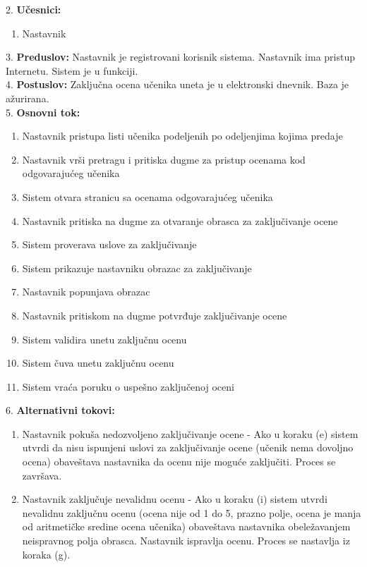 \documentclass{article}
\begin{document}
2. \textbf{Učesnici:}
\begin{enumerate} [label=(\alph*)]
\item Nastavnik
\end{enumerate} 

3. \textbf{Preduslov:} Nastavnik je registrovani korisnik sistema. Nastavnik ima pristup Internetu. Sistem je u funkciji. \\

4. \textbf{Postuslov:} Zaključna ocena učenika uneta je u elektronski dnevnik. Baza je ažurirana. \\

5. \textbf{Osnovni tok:} 
\begin{enumerate} [label=(\alph*)]
\item Nastavnik pristupa listi učenika podeljenih po odeljenjima kojima predaje
\item Nastavnik vrši pretragu i pritiska dugme za pristup ocenama kod odgovarajućeg učenika
\item Sistem otvara stranicu sa ocenama odgovarajućeg učenika
\item Nastavnik pritiska na dugme za otvaranje obrasca za zaključivanje ocene
\item Sistem proverava uslove za zaključivanje
\item Sistem prikazuje nastavniku obrazac za zaključivanje 
\item Nastavnik popunjava obrazac
\item Nastavnik pritiskom na dugme potvrđuje zaključivanje ocene
\item Sistem validira unetu zaključnu ocenu
\item Sistem čuva unetu zaključnu ocenu
\item Sistem vraća poruku o uspešno zaključenoj oceni
\end{enumerate}


6. \textbf{Alternativni tokovi:}
\begin{enumerate} [label=(\roman*)]
\item Nastavnik pokuša nedozvoljeno zaključivanje ocene - Ako u koraku (e) sistem utvrdi da nisu ispunjeni uslovi za zaključivanje ocene (učenik nema dovoljno ocena) obaveštava nastavnika da ocenu nije moguće zaključiti. Proces se završava.
\item Nastavnik zaključuje nevalidnu ocenu - Ako u koraku (i) sistem utvrdi nevalidnu zaključnu ocenu (ocena nije od 1 do 5, prazno polje, ocena je manja od aritmetičke sredine ocena učenika) obaveštava nastavnika obeležavanjem neispravnog polja obrasca. Nastavnik ispravlja ocenu. Proces se nastavlja iz koraka (g).
\end{enumerate}
\end{document}
